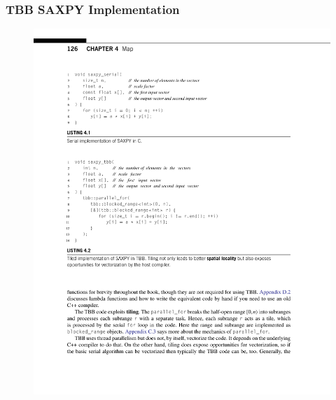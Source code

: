\documentclass[xcolor=dvipsnames]{beamer}
\begin{document}
		\begin{frame} \frametitle{TBB SAXPY Implementation}
			\begin{figure}
				\centering
				\includegraphics[width=115mm]{images/listing-4-2.pdf}
			\end{figure}
		\end{frame}
		
\end{document}
